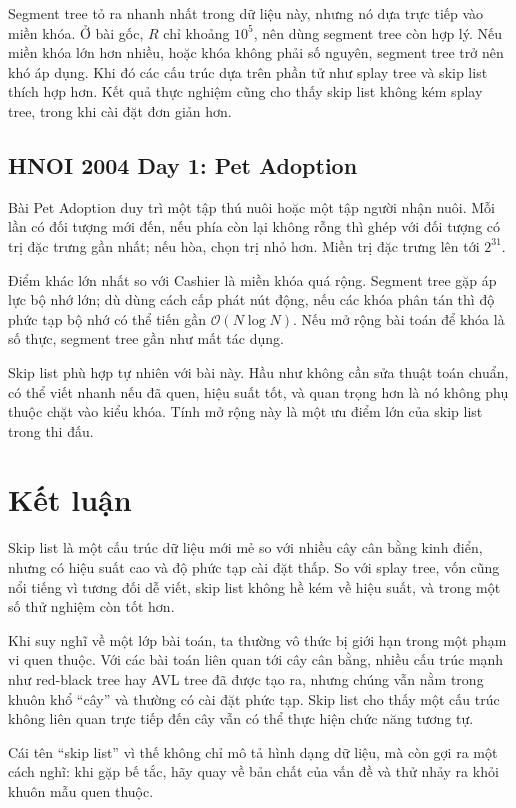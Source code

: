 \documentclass[11pt]{article}
\newcommand{\Oh}{\mathcal{O}}
\begin{document}
Segment tree tỏ ra nhanh nhất trong dữ liệu này, nhưng nó dựa trực tiếp vào
miền khóa. Ở bài gốc, \(R\) chỉ khoảng \(10^5\), nên dùng segment tree còn
hợp lý. Nếu miền khóa lớn hơn nhiều, hoặc khóa không phải số nguyên, segment
tree trở nên khó áp dụng. Khi đó các cấu trúc dựa trên phần tử như splay tree
và skip list thích hợp hơn. Kết quả thực nghiệm cũng cho thấy skip list không
kém splay tree, trong khi cài đặt đơn giản hơn.

\subsection{HNOI 2004 Day 1: Pet Adoption}

Bài Pet Adoption duy trì một tập thú nuôi hoặc một tập người nhận nuôi. Mỗi
lần có đối tượng mới đến, nếu phía còn lại không rỗng thì ghép với đối tượng
có trị đặc trưng gần nhất; nếu hòa, chọn trị nhỏ hơn. Miền trị đặc trưng lên
tới \(2^{31}\).

Điểm khác lớn nhất so với Cashier là miền khóa quá rộng. Segment tree gặp áp
lực bộ nhớ lớn; dù dùng cách cấp phát nút động, nếu các khóa phân tán thì độ
phức tạp bộ nhớ có thể tiến gần \(\Oh(N\log N)\). Nếu mở rộng bài toán để
khóa là số thực, segment tree gần như mất tác dụng.

Skip list phù hợp tự nhiên với bài này. Hầu như không cần sửa thuật toán
chuẩn, có thể viết nhanh nếu đã quen, hiệu suất tốt, và quan trọng hơn là nó
không phụ thuộc chặt vào kiểu khóa. Tính mở rộng này là một ưu điểm lớn của
skip list trong thi đấu.

\section{Kết luận}

Skip list là một cấu trúc dữ liệu mới mẻ so với nhiều cây cân bằng kinh điển,
nhưng có hiệu suất cao và độ phức tạp cài đặt thấp. So với splay tree, vốn
cũng nổi tiếng vì tương đối dễ viết, skip list không hề kém về hiệu suất, và
trong một số thử nghiệm còn tốt hơn.

Khi suy nghĩ về một lớp bài toán, ta thường vô thức bị giới hạn trong một
phạm vi quen thuộc. Với các bài toán liên quan tới cây cân bằng, nhiều cấu
trúc mạnh như red-black tree hay AVL tree đã được tạo ra, nhưng chúng vẫn nằm
trong khuôn khổ ``cây'' và thường có cài đặt phức tạp. Skip list cho thấy một
cấu trúc không liên quan trực tiếp đến cây vẫn có thể thực hiện chức năng
tương tự.

Cái tên ``skip list'' vì thế không chỉ mô tả hình dạng dữ liệu, mà còn gợi ra
một cách nghĩ: khi gặp bế tắc, hãy quay về bản chất của vấn đề và thử nhảy ra
khỏi khuôn mẫu quen thuộc.
\end{document}
